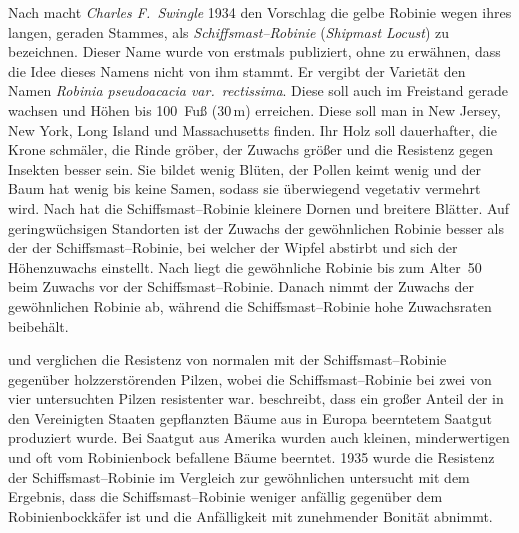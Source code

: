 \documentclass[twocolumn]{scrartcl}
\begin{document}
Nach \citet{detwiler1937robinie} macht \emph{Charles F.\ Swingle} 1934
den Vorschlag die gelbe Robinie wegen ihres langen, geraden Stammes,
als \emph{Schiffsmast--Robinie} (\emph{Shipmast Locust}) zu
bezeichnen. Dieser Name wurde von \citet{raber1936shipmast} erstmals
publiziert, ohne zu erwähnen, dass die Idee dieses Namens nicht von ihm
stammt. Er vergibt der Varietät den Namen \emph{Robinia pseudoacacia
var.\ rectissima}. Diese soll auch im Freistand gerade wachsen und
Höhen bis 100~Fuß (30\,m) erreichen. Diese soll man in New Jersey, New
York, Long Island und Massachusetts finden. Ihr Holz soll dauerhafter,
die Krone schmäler, die Rinde gröber, der Zuwachs größer und die
Resistenz gegen Insekten besser sein. Sie bildet wenig Blüten, der
Pollen keimt wenig und der Baum hat wenig bis keine Samen, sodass sie
überwiegend vegetativ vermehrt wird.
Nach \citet{hopp1941robinieUnterschied} hat die
Schiffsmast--Robinie kleinere Dornen und breitere Blätter. Auf
geringwüchsigen Standorten ist der Zuwachs der gewöhnlichen Robinie
besser als der der Schiffsmast--Robinie, bei welcher der Wipfel
abstirbt und sich der Höhenzuwachs einstellt.
Nach \citet{hopp1947robinie} liegt die gewöhnliche Robinie bis zum Alter~50
beim Zuwachs vor der
Schiffsmast--Robinie. Danach nimmt der Zuwachs der gewöhnlichen
Robinie ab, während die Schiffsmast--Robinie hohe Zuwachsraten
beibehält.

\citet{hirt1938robinie} und \citet{toole1938robinie} verglichen die Resistenz von
normalen mit der Schiffsmast--Robinie gegenüber holzzerstörenden Pilzen, wobei
die Schiffsmast--Robinie bei zwei von vier untersuchten Pilzen resistenter war.
\citet{hall1937robinie} beschreibt, dass ein großer Anteil der in den Vereinigten
Staaten gepflanzten Bäume aus in Europa beerntetem Saatgut produziert wurde. Bei
Saatgut aus Amerika wurden auch kleinen, minderwertigen und oft vom Robinienbock
befallene Bäume beerntet. 1935 wurde die Resistenz der Schiffsmast--Robinie im
Vergleich zur gewöhnlichen untersucht mit dem Ergebnis, dass die
Schiffsmast--Robinie weniger anfällig gegenüber dem Robinienbockkäfer ist und
die Anfälligkeit mit zunehmender Bonität abnimmt.
\end{document}
